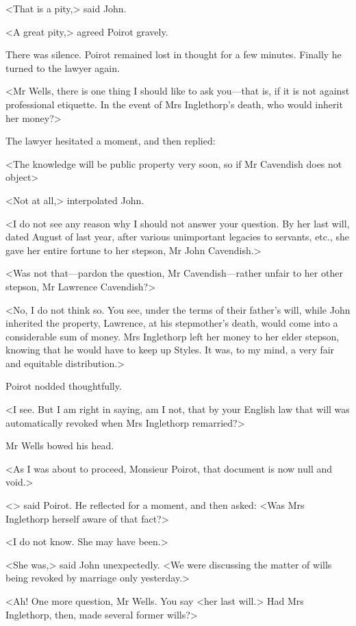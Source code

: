  <That is a pity,> said John. 

 <A great pity,> agreed Poirot gravely. 

 There was silence. Poirot remained lost in thought for a few minutes. Finally he turned to the lawyer again. 

 <Mr Wells, there is one thing I should like to ask you—that is, if it is not against professional etiquette. In the event of Mrs Inglethorp's death, who would inherit her money?> 

 The lawyer hesitated a moment, and then replied: 

 <The knowledge will be public property very soon, so if Mr Cavendish does not object\longdash> 

 <Not at all,> interpolated John. 

 <I do not see any reason why I should not answer your question. By her last will, dated August of last year, after various unimportant legacies to servants, etc., she gave her entire fortune to her stepson, Mr John Cavendish.> 

 <Was not that—pardon the question, Mr Cavendish—rather unfair to her other stepson, Mr Lawrence Cavendish?> 

 <No, I do not think so. You see, under the terms of their father's will, while John inherited the property, Lawrence, at his stepmother's death, would come into a considerable sum of money. Mrs Inglethorp left her money to her elder stepson, knowing that he would have to keep up Styles. It was, to my mind, a very fair and equitable distribution.> 

 Poirot nodded thoughtfully. 

 <I see. But I am right in saying, am I not, that by your English law that will was automatically revoked when Mrs Inglethorp remarried?> 

 Mr Wells bowed his head. 

 <As I was about to proceed, Monsieur Poirot, that document is now null and void.> 

 <> said Poirot. He reflected for a moment, and then asked: <Was Mrs Inglethorp herself aware of that fact?> 

 <I do not know. She may have been.> 

 <She was,> said John unexpectedly. <We were discussing the matter of wills being revoked by marriage only yesterday.> 

 <Ah! One more question, Mr Wells. You say <her last will.> Had Mrs Inglethorp, then, made several former wills?> 

